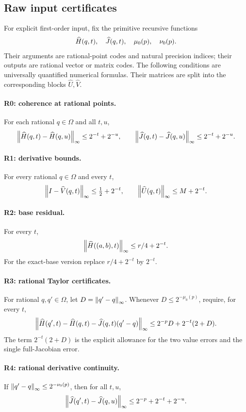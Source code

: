 \subsection{Raw input certificates}\label{sec:raw}

For explicit first-order input, fix the primitive recursive
functions
\[
 \widehat H(q,t),\quad \widehat J(q,t),\quad
 \mu_0(p),\quad \nu_0(p).
\]
Their arguments are rational-point codes and natural precision
indices; their outputs are rational vector or matrix codes.
The following conditions are universally quantified numerical
formulas. Their matrices are split into the corresponding
blocks \(\widehat U,\widehat V\).

\paragraph{R0: coherence at rational points.}
For each rational \(q\in\Omega\) and all \(t,u\),
\[
 \left\lVert\widehat H(q,t)-\widehat H(q,u)\right\rVert_\infty\le2^{-t}+2^{-u},\qquad
 \left\lVert\widehat J(q,t)-\widehat J(q,u)\right\rVert_\infty\le2^{-t}+2^{-u}.
\]

\paragraph{R1: derivative bounds.}
For every rational \(q\in\Omega\) and every \(t\),
\[
 \left\lVert I-\widehat V(q,t)\right\rVert_\infty\le\tfrac12+2^{-t},
 \qquad \left\lVert\widehat U(q,t)\right\rVert_\infty\le M+2^{-t}.
\]

\paragraph{R2: base residual.}
For every \(t\),
\[
 \left\lVert\widehat H((a,b),t)\right\rVert_\infty\le r/4+2^{-t}.
\]
For the exact-base version replace \(r/4+2^{-t}\) by \(2^{-t}\).

\paragraph{R3: rational Taylor certificates.}
For rational \(q,q'\in\Omega\), let \(D=\left\lVert q'-q\right\rVert_\infty\).
Whenever \(D\le2^{-\mu_0(p)}\), require, for every \(t\),
\begin{equation}\label{eq:rawtaylor}
 \left\lVert\widehat H(q',t)-\widehat H(q,t)-\widehat J(q,t)(q'-q)\right\rVert_\infty
 \le 2^{-p}D+2^{-t}(2+D).
\end{equation}
The term \(2^{-t}(2+D)\) is the explicit allowance for the two
value errors and the single full-Jacobian error.

\paragraph{R4: rational derivative continuity.}
If \(\left\lVert q'-q\right\rVert_\infty\le2^{-\nu_0(p)}\), then for all \(t,u\),
\[
 \left\lVert\widehat J(q',t)-\widehat J(q,u)\right\rVert_\infty
 \le2^{-p}+2^{-t}+2^{-u}.
\]

